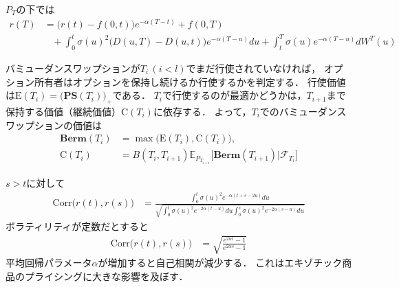 \documentclass[11pt,a4paper]{jsarticle}
\newcommand{\E}{\mathbb{E}}
\newcommand{\PS}{\textbf{PS}}
\newcommand{\Berm}{\textbf{Berm}}
\begin{document}
$P_T$の下では
\begin{align}
r(T)
& =
\bigl( r(t) - f(0, t) \bigr) e^{-\alpha (T - t)} + f(0, T) \nonumber \\
& \hspace{10pt}
+ \int_0^t \sigma(u)^2 \bigl( D(u, T) - D(u, t) \bigr) e^{-\alpha (T - u)} du
+ \int_t^T \sigma(u) e^{-\alpha (T - u)} d W^T (u) \nonumber
\end{align}

バミューダンスワップションが$T_i \, (i < l)$でまだ行使されていなければ，
オプション所有者はオプションを保持し続けるか行使するかを判定する．
行使価値は$\mathrm{E}(T_i) = \bigl( \PS(T_i) \bigr)_+$である．
$T_i$で行使するのが最適かどうかは，$T_{i+1}$まで保持する価値（継続価値）$\mathrm{C}(T_i)$に依存する．
よって，$T_i$でのバミューダンスワップションの価値は
\begin{align}
\Berm(T_i)
& =
\max \bigl( \mathrm{E}(T_i), \mathrm{C}(T_i) \bigr), \nonumber \\
\mathrm{C}(T_i)
& =
B(T_i, T_{i+1}) \E_{P_{T_{i+1}}} \bigl[ \Berm(T_{i+1}) | \mathcal{F}_{T_i} \bigr] \nonumber
\end{align}

$s > t$に対して
\begin{align}
\mathrm{Corr} \bigl( r(t), r(s) \bigr)
& =
\frac{\int_0^t \sigma(u)^2 e^{-\alpha (t + s - 2u)} du}
{\sqrt{\int_0^t \sigma(u)^2 e^{-2\alpha (t - u)} du \int_0^s \sigma(u)^2 e^{-2\alpha (s - u)} du}} \nonumber
\end{align}
ボラティリティが定数だとすると
\begin{align}
\mathrm{Corr} \bigl( r(t), r(s) \bigr)
& =
\sqrt{\frac{e^{2 \alpha t} - 1}{e^{2 \alpha s} - 1}} \nonumber
\end{align}
平均回帰パラメータ$\alpha$が増加すると自己相関が減少する．
これはエキゾチック商品のプライシングに大きな影響を及ぼす．
\end{document}
